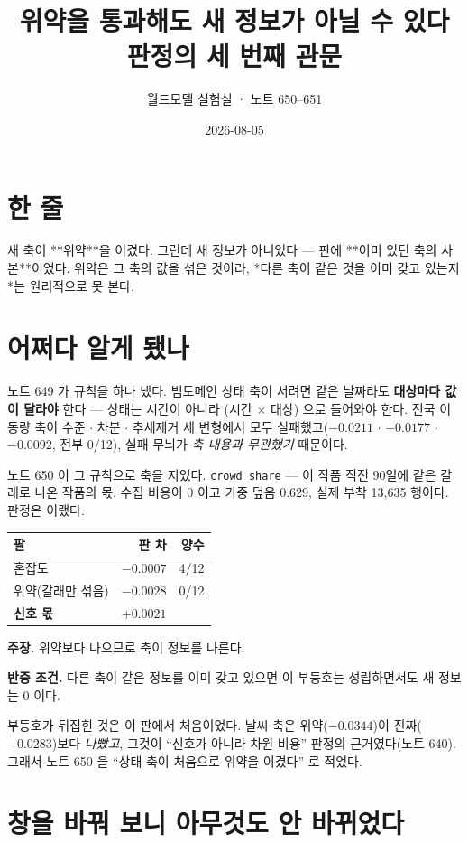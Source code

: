 \documentclass[10pt,a4paper]{article}
\title{\bfseries 위약을 통과해도 새 정보가 아닐 수 있다\\[2pt]
\large 판정의 세 번째 관문}
\author{월드모델 실험실 · 노트 650--651}
\date{2026-08-05}
\newcommand{\claim}[2]{\begin{claimbox}\textbf{주장.} #1\par\smallskip
  \textcolor{gray!70}{\textbf{반증 조건.} #2}\end{claimbox}}
\begin{document}
\maketitle

\section{한 줄}

새 축이 **위약**을 이겼다. 그런데 새 정보가 아니었다 --- 판에 **이미 있던 축의
사본**이었다. 위약은 그 축의 값을 섞은 것이라, *다른 축이 같은 것을 이미
갖고 있는지*는 원리적으로 못 본다.

\section{어쩌다 알게 됐나}

노트 649 가 규칙을 하나 냈다. 범도메인 상태 축이 서려면 같은 날짜라도
\textbf{대상마다 값이 달라야} 한다 --- 상태는 시간이 아니라 (시간 $\times$ 대상)
으로 들어와야 한다. 전국 이동량 축이 수준 $\cdot$ 차분 $\cdot$ 추세제거 세
변형에서 모두 실패했고($-0.0211$ $\cdot$ $-0.0177$ $\cdot$ $-0.0092$, 전부 0/12),
실패 무늬가 \emph{축 내용과 무관했기} 때문이다.

노트 650 이 그 규칙으로 축을 지었다. \verb|crowd_share| --- 이 작품 직전 90일에
같은 갈래로 나온 작품의 몫. 수집 비용이 0 이고 가중 덮음 0.629, 실제 부착
13,635 행이다. 판정은 이랬다.

\begin{center}\small
\begin{tabular}{lrr}\toprule
팔 & 판 차 & 양수 \\ \midrule
혼잡도 & $-0.0007$ & 4/12 \\
위약(갈래만 섞음) & $-0.0028$ & 0/12 \\ \midrule
\textbf{신호 몫} & $\mathbf{+0.0021}$ & \\ \bottomrule
\end{tabular}\end{center}

\claim{위약보다 나으므로 축이 정보를 나른다.}{다른 축이 같은 정보를 이미
갖고 있으면 이 부등호는 성립하면서도 새 정보는 0 이다.}

부등호가 뒤집힌 것은 이 판에서 처음이었다. 날씨 축은 위약($-0.0344$)이
진짜($-0.0283$)보다 \emph{나빴고}, 그것이 ``신호가 아니라 차원 비용'' 판정의
근거였다(노트 640). 그래서 노트 650 을 ``상태 축이 처음으로 위약을 이겼다''
로 적었다.

\section{창을 바꿔 보니 아무것도 안 바뀌었다}
\end{document}
